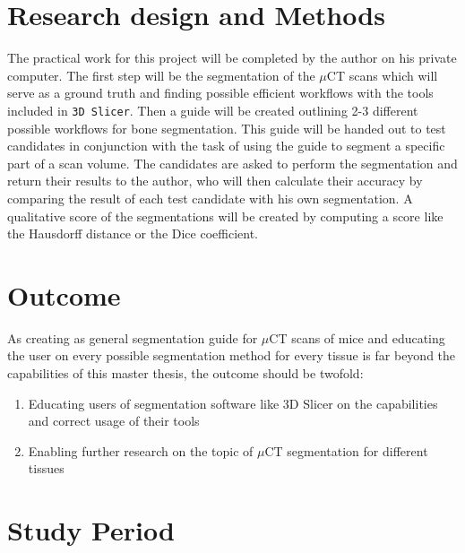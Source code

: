 \clearpage
\section{Research design and Methods}
\begin{body}
	The practical work for this project will be completed by the author on his private computer.
	The first step will be the segmentation of the $\mu$CT scans which will serve as a ground truth and finding possible efficient workflows with the tools included in \texttt{3D Slicer}.
	Then a guide will be created outlining 2-3 different possible workflows for bone segmentation.
	This guide will be handed out to test candidates in conjunction with the task of using the guide to segment a specific part of a scan volume.
	The candidates are asked to perform the segmentation and return their results to the author, who will then calculate their accuracy by comparing the result of each test candidate with his own segmentation. A qualitative score of the segmentations will be created by computing a score like the Hausdorff distance\cite{birsanOneHundredYears2006} or the Dice coefficient\cite{diceMeasuresAmountEcologic1945}.

\end{body}

\section{Outcome}
\begin{body}
	As creating as general segmentation guide for $\mu$CT scans of mice and educating the user on every possible segmentation method for every tissue is far beyond the capabilities of this master thesis, the outcome should be twofold:
	\begin{enumerate}
		\item Educating users of segmentation software like 3D Slicer on the capabilities and correct usage of their tools
		\item Enabling further research on the topic of $\mu$CT segmentation for different tissues
	\end{enumerate}
\end{body}

\clearpage
\section{Study Period}
